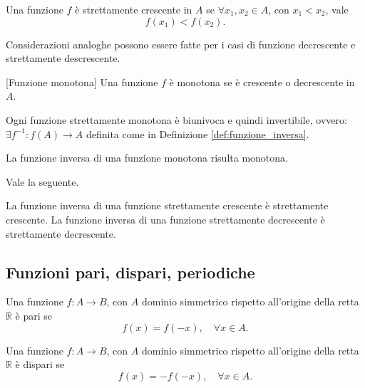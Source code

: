 \begin{definition}\label{def:funzione_strettamente_crescente}
    Una funzione $f$ è strettamente crescente in $A$ se $\forall x_1,x_2\in A$, con $x_1<x_2$, vale
    \begin{equation*}
        f(x_1)< f(x_2).
    \end{equation*}
\end{definition}

Considerazioni analoghe possono essere fatte per i casi di funzione decrescente e strettamente descrescente.

\begin{definition}\label{def:funzione_monotona}[Funzione monotona]
    Una funzione $f$ è monotona se è crescente o decrescente in $A$.
\end{definition}

\begin{proposition}
    Ogni funzione strettamente monotona è biunivoca e quindi invertibile, ovvero: $\exists f^{-1}\colon f(A)\rightarrow A$ definita come in Definizione \ref{def:funzione_inversa}.
\end{proposition}

\begin{remark}
    La funzione inversa di una funzione monotona risulta monotona. 
\end{remark}

Vale la seguente.
\begin{proposition}\label{prop:funzione_inversa_crescente}
    La funzione inversa di una funzione strettamente crescente è strettamente crescente. La funzione inversa di una funzione strettamente decrescente è strettamente decrescente.
\end{proposition}

\subsection{Funzioni pari, dispari, periodiche}
\begin{definition}
    Una funzione $f\colon A\rightarrow B$, con $A$ dominio simmetrico rispetto all'origine della retta $\mathbb R$ è pari se
    \begin{equation*}
        f(x) = f(-x),\quad \forall x\in A.
    \end{equation*}
\end{definition}

\begin{definition}
    Una funzione $f\colon A\rightarrow B$, con $A$ dominio simmetrico rispetto all'origine della retta $\mathbb R$ è dispari se
    \begin{equation*}
        f(x) = -f(-x),\quad \forall x\in A.
    \end{equation*}
\end{definition}

